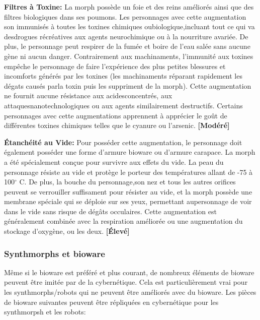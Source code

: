 {{\textbf{Filtres à Toxine:} La morph possède un foie et des reins améliorés ainsi que des filtres biologiques dans ses poumons. Les personnages avec cette augmentation son immunisés à toutes les toxines chimiques oubiologique,incluant tout ce qui va desdrogues récréatives aux agents neurochimique ou à la nourriture avariée. De plus, le personnage peut respirer de la fumée et boire de l'eau salée sans aucune gène ni aucun danger. Contrairement aux machinaments, l'immunité aux toxines empêche le personnage de faire l'expérience des plus petites blessures et incomforts générés par les toxines (les machinaments réparant rapidement les dégats causés parla toxin puis les suppriment de la morph). Cette augmentation ne fournit aucune résistance aux acidesconcentrés, aux attaquesnanotechnologiques ou aux agents similairement destructifs. Certains personnages avec cette augmentations apprennent à apprécier le goût de différentes toxines chimiques telles que le cyanure ou l'arsenic. \textbf{[Modéré]} 

\textbf{Étanchéité au Vide:} Pour posséder cette augmentation, le personnage doit également posséder une forme d'armure bioware ou d'armure carapace. La morph a été spécialement conçue pour survivre aux effets du vide. La peau du personnage résiste au vide et protège le porteur des températures allant de -75 à 100$^{\circ}$ C. De plus, la bouche du personnage,son nez et tous les autres orifices peuvent se verrouiller suffisament pour résister au vide, et la morph possède une membrane spéciale qui se déploie sur ses yeux, permettant aupersonnage de voir dans le vide sans risque de dégâts occulaires. Cette augmentation est généralement combinée avec la respiration améliorée ou une augmentation du stockage d'oxygène, ou les deux. \textbf{[Élevé]} 

\subsubsection{Synthmorphs et bioware} 

Même si le bioware est préféré et plus courant, de nombreux éléments de bioware peuvent être imitée par de la cybernétique. Cela est particulièrement vrai pour les synthmorphs/robots qui ne peuvent être améliorés avec du bioware. Les pièces de bioware suivantes peuvent être répliquées en cybernétique pour les synthmorpsh et les robots: 

}}
